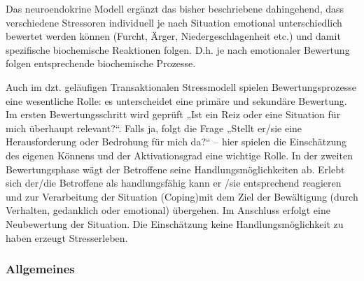{Das neuroendokrine Modell ergänzt das bisher beschriebene dahingehend, dass verschiedene Stressoren individuell je nach Situation emotional unterschiedlich bewertet werden können (Furcht, Ärger, Niedergeschlagenheit etc.) und damit spezifische biochemische Reaktionen folgen. D.h. je nach emotionaler Bewertung folgen entsprechende biochemische Prozesse.

Auch im dzt. geläufigen Transaktionalen Stressmodell spielen Bewertungsprozesse eine wesentliche Rolle: es unterscheidet eine primäre und sekundäre Bewertung. Im ersten Bewertungsschritt wird geprüft „Ist ein Reiz oder eine  Situation für mich überhaupt relevant?“. Falls ja, folgt die Frage „Stellt er/sie eine Herausforderung oder Bedrohung für mich da?“ – hier spielen die Einschätzung des eigenen Könnens und der Aktivationsgrad eine wichtige Rolle. In der zweiten Bewertungsphase wägt der Betroffene seine Handlungsmöglichkeiten ab. Erlebt sich der/die Betroffene als handlungsfähig kann er /sie entsprechend reagieren und zur Verarbeitung der Situation (Coping)mit dem Ziel der Bewältigung (durch Verhalten, gedanklich oder emotional) übergehen. Im Anschluss erfolgt eine Neubewertung der Situation. Die Einschätzung keine Handlungsmöglichkeit zu haben erzeugt Stresserleben. 
}%

 
\subsubsection{Allgemeines 
}

